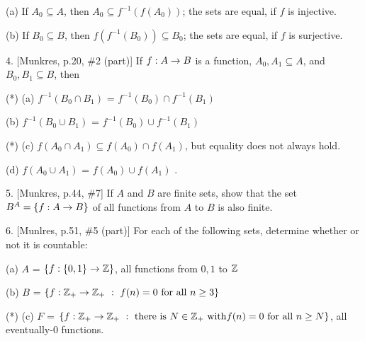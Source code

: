 \ssk

\item{} (a) If $A_0\subseteq A$, then $A_0\subseteq f^{-1}(f(A_0))$; the sets are equal,
if $f$ is injective.

\ssk

\item{} (b) If $B_0\subseteq B$, then $f(f^{-1}(B_0))\subseteq B_0$; the sets are equal,
if $f$ is surjective.

\msk

\item{4.} [Munkres, p.20, \#2 (part)] If $f:A\rightarrow B$ is a function, $A_0,A_1\subseteq A$,
and $B_0,B_1\subseteq B$, then

\ssk

\item{(*)} (a) $f^{-1}(B_0\cap B_1)$ = $f^{-1}(B_0) \cap f^{-1}(B_1)$

\ssk

\item{} (b) $f^{-1}(B_0\cup B_1)$ = $f^{-1}(B_0) \cup f^{-1}(B_1)$

\ssk

\item{(*)} (c) $f(A_0\cap A_1) \subseteq f(A_0)\cap f(A_1)$, but equality does not always hold.

\ssk

\item{} (d) $f(A_0\cup A_1)$ = $f(A_0)\cup f(A_1)$ .

\msk

\item{5.} [Munkres, p.44, \#7] If $A$ and $B$ are finite sets, show that the
set $B^A = \{f:A\rightarrow B\}$ of all functions from $A$ to $B$ is also finite.

\msk

\item{6.} [Munlres, p.51, \#5 (part)] For each of the following sets, determine
whether or not it is countable:

\ssk

\item{} (a) $A$ = $\{f:\{0,1\}\rightarrow {\Bbb Z}\}$, all functions from ${0,1}$ to $\Bbb Z$

\ssk

\item{} (b) $B$ = $\{f:{\Bbb Z}_+\ra {\Bbb Z}_+\ :\ f(n)=0\ \text{for}\ \text{all}\ n\geq 3\}$

\ssk

\item{(*)} (c) $F$ = $\{f:{\Bbb Z}_+\ra {\Bbb Z}_+\ :\ \text{there}\ \text{is}\ N\in{\Bbb Z}_+\ \text{with}
f(n)=0\ \text{for}\ \text{all}\ n\geq N\}$, all eventually-0 functions.

